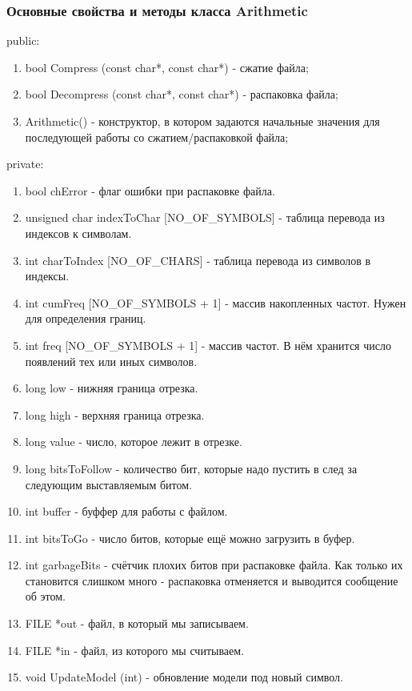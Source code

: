 \documentclass[12pt]{article}
\begin{document}
\subsubsection*{Основные свойства и методы класса Arithmetic}
\noindent
public:

\begin{enumerate}
	\item bool Compress (const char*, const char*) - сжатие файла;
	\item bool Decompress (const char*, const char*) - распаковка файла;
	\item Arithmetic() - конструктор, в котором задаются начальные значения для последующей работы со сжатием/распаковкой файла;
\end{enumerate}
\noindent
private:

\begin{enumerate}
	\item bool chError - флаг ошибки при распаковке файла.
	\item unsigned char indexToChar [NO\_OF\_SYMBOLS] - таблица перевода из индексов к символам.
	\item int charToIndex [NO\_OF\_CHARS] - таблица перевода из символов в индексы.
	\item int cumFreq [NO\_OF\_SYMBOLS + 1] - массив накопленных частот. Нужен для определения границ.
	\item int freq [NO\_OF\_SYMBOLS + 1] - массив частот. В нём хранится число появлений тех или иных символов.
	\item long low - нижняя граница отрезка. 
	\item long high - верхняя граница отрезка.
	\item long value - число, которое лежит в отрезке.
	\item long bitsToFollow - количество бит, которые надо пустить в след за следующим выставляемым битом.
	\item int buffer - буффер для работы с файлом.
	\item int bitsToGo - число битов, которые ещё можно загрузить в буфер.
	\item int garbageBits - счётчик плохих битов при распаковке файла. Как только их становится слишком много - распаковка отменяется и выводится сообщение об этом.
	\item FILE *out - файл, в который мы записываем.
	\item FILE *in - файл, из которого мы считываем.
	\item void UpdateModel (int) - обновление модели под новый символ.

\end{enumerate}
\end{document}
